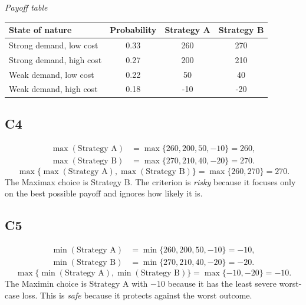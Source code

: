 \begin{ExamProblems}
\begin{center}
		\end{center}
		\begin{center}
			\textit{Payoff table} \\
			\begin{tabular}{l c c c}
				\toprule
				State of nature & Probability & Strategy A & Strategy B \\
				\midrule
				Strong demand, low cost & 0.33 & 260 & 270 \\
				Strong demand, high cost & 0.27 & 200 & 210 \\
				Weak demand, low cost & 0.22 & 50 & 40 \\
				Weak demand, high cost & 0.18 & -10 & -20 \\
				\bottomrule
			\end{tabular}
		\end{center}

		\subsection*{C4}
		\[
		\begin{aligned}
		\max(\text{Strategy A}) &= \max\{260,200,50,-10\} = 260,\\
		\max(\text{Strategy B}) &= \max\{270,210,40,-20\} = 270.
		\end{aligned}
		\]
		\[
		\max\{\max(\text{Strategy A}), \max(\text{Strategy B})\}
		= \max\{260, 270\}
		= 270.
		\]
		The Maximax choice is Strategy B. The criterion is \emph{risky} because it focuses only on the best possible payoff and ignores how likely it is.

		\subsection*{C5}
		\[
		\begin{aligned}
		\min(\text{Strategy A}) &= \min\{260,200,50,-10\} = -10,\\
		\min(\text{Strategy B}) &= \min\{270,210,40,-20\} = -20.
		\end{aligned}
		\]
		\[
		\max\{\min(\text{Strategy A}), \min(\text{Strategy B})\}
		= \max\{-10, -20\}
		= -10.
		\]
		The Maximin choice is Strategy A with $-10$ because it has the least severe worst-case loss. This is \emph{safe} because it protects against the worst outcome.


\end{ExamProblems}
